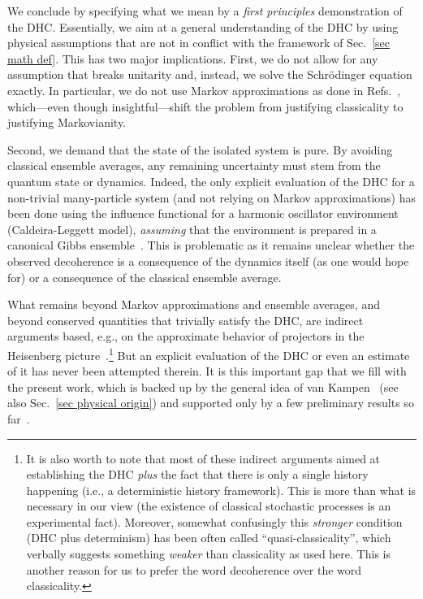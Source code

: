 \documentclass[pre,onecolumn,12pt,aps,longbibliography,nofootinbib]{revtex4-2}
\begin{document}
We conclude by specifying what we mean by a \emph{first principles} demonstration of the DHC. Essentially, we aim at a general understanding of the DHC by using physical assumptions that are not in conflict with the framework of Sec.~\ref{sec math def}. This has two major implications. First, we do not allow for any assumption that breaks unitarity and, instead, we solve the Schr\"odinger equation exactly. In particular, we do not use Markov approximations as done in Refs.~\cite{PazZurekPRD1993, DiosiEtAlPRL1995, BrunPRL1997, YuPA1998, BrunPRA2000, SmirneEtAlQST2018, StrasbergDiazPRA2019, MilzEtAlPRX2020, StrasbergSP2023}, which---even though insightful---shift the problem from justifying classicality to justifying Markovianity.

Second, we demand that the state of the isolated system is pure. By avoiding classical ensemble averages, any remaining uncertainty must stem from the quantum state or dynamics. Indeed, the only explicit evaluation of the DHC for a non-trivial many-particle system (and not relying on Markov approximations) has been done using the influence functional for a harmonic oscillator environment (Caldeira-Leggett model), \emph{assuming} that the environment is prepared in a canonical Gibbs ensemble~\cite{SchmidAP1987, DowkerHalliwellPRD1992, GellMannHartlePRD1993, HalliwellPRD1999, HalliwellPRD2001, SubasiHuPRE2012}. This is problematic as it remains unclear whether the observed decoherence is a consequence of the dynamics itself (as one would hope for) or a consequence of the classical ensemble average.

What remains beyond Markov approximations and ensemble averages, and beyond conserved quantities that trivially satisfy the DHC, are indirect arguments based, e.g., on the approximate behavior of projectors in the Heisenberg picture~\cite{OmnesJSP1989, OmnesRMP1992, GellMannHartlePRD1993, BrunHalliwellPRD1996, HalliwellPRD1998, HalliwellPRL1999, CalzettaHuPRD1999, HalliwellPRD2003, GellMannHartlePRA2007, HalliwellInBook2010}.\footnote{It is also worth to note that most of these indirect arguments aimed at establishing the DHC \emph{plus} the fact that there is only a single history happening (i.e., a deterministic history framework). This is more than what is necessary in our view (the existence of classical stochastic processes is an experimental fact). Moreover, somewhat confusingly this \emph{stronger} condition (DHC plus determinism) has been often called ``quasi-classicality'', which verbally suggests something \emph{weaker} than classicality as used here. This is another reason for us to prefer the word decoherence over the word classicality. } But an explicit evaluation of the DHC or even an estimate of it has never been attempted therein. It is this important gap that we fill with the present work, which is backed up by the general idea of van Kampen~\cite{VanKampenPhys1954} (see also Sec.~\ref{sec physical origin}) and supported only by a few preliminary results so far~\cite{GemmerSteinigewegPRE2014, SchmidtkeGemmerPRE2016, NationPorrasPRE2020, StrasbergEtAlPRA2023, StrasbergSP2023}.
\end{document}
